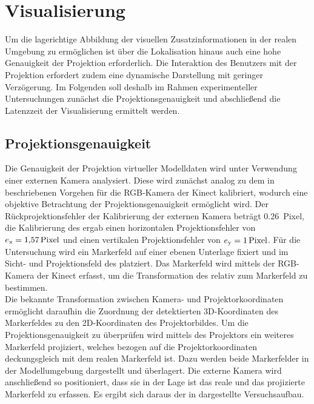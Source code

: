 \prever{
}



\section{Visualisierung}
Um die lagerichtige Abbildung der visuellen Zusatzinformationen in der realen Umgebung zu ermöglichen ist über die Lokalisation hinaus auch eine hohe Genauigkeit der Projektion erforderlich. Die Interaktion des Benutzers mit der Projektion erfordert zudem eine dynamische Darstellung mit geringer Verzögerung. Im Folgenden soll deshalb im Rahmen experimenteller Untersuchungen zunächst die Projektionsgenauigkeit und abschließend die Latenzzeit der Visualisierung ermittelt werden.

\subsection{Projektionsgenauigkeit}
Die Genauigkeit der Projektion virtueller Modelldaten wird unter Verwendung einer externen Kamera analysiert. Diese wird zunächst analog zu dem in  beschriebenen Vorgehen für die RGB-Kamera der Kinect kalibriert, wodurch eine objektive Betrachtung der Projektionsgenauigkeit ermöglicht wird. Der Rückprojektionsfehler der Kalibrierung der externen Kamera beträgt \SI{0,26}{Pixel}, die Kalibrierung des  ergab einen horizontalen Projektionsfehler von $e_{\mathrm{x}} = \SI{1,57}{Pixel}$ und einen vertikalen Projektionsfehler von $e_{\mathrm{y}} = \SI{1}{Pixel}$. Für die Untersuchung wird ein Markerfeld auf einer ebenen Unterlage fixiert und im Sicht- und Projektionsfeld des  platziert. Das Markerfeld wird mittels der RGB-Kamera der Kinect erfasst, um die Transformation des  relativ zum Markerfeld zu bestimmen.\\

Die bekannte Transformation zwischen Kamera- und Projektorkoordinaten ermöglicht daraufhin die Zuordnung der detektierten 3D-Koordinaten des Markerfeldes zu den 2D-Koordinaten des Projektorbildes. Um die Projektionsgenauigkeit zu überprüfen wird mittels des Projektors ein weiteres Markerfeld projiziert, welches bezogen auf die Projektorkoordinaten deckungsgleich mit dem realen Markerfeld ist. Dazu werden beide Markerfelder in der Modellumgebung dargestellt und überlagert. Die externe Kamera wird anschließend so positioniert, dass sie in der Lage ist das reale und das projizierte Markerfeld zu erfassen. Es ergibt sich daraus der in  dargestellte Versuchsaufbau.

